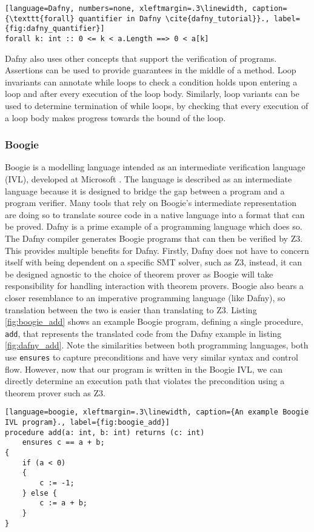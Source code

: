 \begin{lstlisting}[language=Dafny, numbers=none, xleftmargin=.3\linewidth, caption={\texttt{forall} quantifier in Dafny \cite{dafny_tutorial}}., label={fig:dafny_quantifier}]
forall k: int :: 0 <= k < a.Length ==> 0 < a[k]
\end{lstlisting}
\par
Dafny also uses other concepts that support the verification of programs. Assertions can be used to provide guarantees in the middle of a method. Loop invariants can annotate while loops to check a condition holds upon entering a loop and after every execution of the loop body. Similarly, loop variants can be used to determine termination of while loops, by checking that every execution of a loop body makes progress towards the bound of the loop.
\subsubsection{Boogie}
Boogie is a modelling language intended as an intermediate verification language (IVL), developed at Microsoft \cite{boogie}. The language is described as an intermediate language because it is designed to bridge the gap between a program and a program verifier. Many tools that rely on Boogie's intermediate representation are doing so to translate source code in a native language into a format that can be proved. Dafny is a prime example of a programming language which does so. The Dafny compiler generates Boogie programs that can then be verified by Z3. This provides multiple benefits for Dafny. Firstly, Dafny does not have to concern itself with being dependent on a specific SMT solver, such as Z3, instead, it can be designed agnostic to the choice of theorem prover as Boogie will take responsibility for handling interaction with theorem provers. Boogie also bears a closer resemblance to an imperative programming language (like Dafny), so translation between the two is easier than translating to Z3. Listing \ref{fig:boogie_add} shows an example Boogie program, defining a single procedure, \texttt{add}, that represents the translated code from the Dafny example in listing \ref{fig:dafny_add}. Note the similarities between both programming languages, both use \texttt{ensures} to capture preconditions and have very similar syntax and control flow. However, now that our program is written in the Boogie IVL, we can directly determine an execution path that violates the precondition using a theorem prover such as Z3.
\begin{lstlisting}[language=boogie, xleftmargin=.3\linewidth, caption={An example Boogie IVL program}., label={fig:boogie_add}]
procedure add(a: int, b: int) returns (c: int)
    ensures c == a + b;
{
    if (a < 0) 
    {
        c := -1;
    } else {
        c := a + b;
    }
}
\end{lstlisting}

